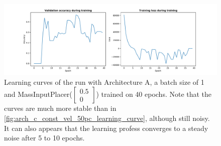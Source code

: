 \begin{figure}[hb]
	\centering
	\includegraphics[scale=0.4]{figures/A_batch1_ConstVelInputPlacer([0.5, 0]])_epoch40.pdf}
	\caption{Learning curves of the run with Architecture A, a batch size of 1 and MassInputPlacer($\begin{bmatrix} 0.5\\0\end{bmatrix}$)
		trained on 40 epochs. 
		Note that the curves are much more stable than in \ref{fig:arch_c_const_vel_50pc_learning_curve}, although still noisy.
		It can also appears that the learning profess converges to a steady noise after 5 to 10 epochs.}
	\label{fig:arch_a_const_vel_mass_inp_placer_curves}
\end{figure}
